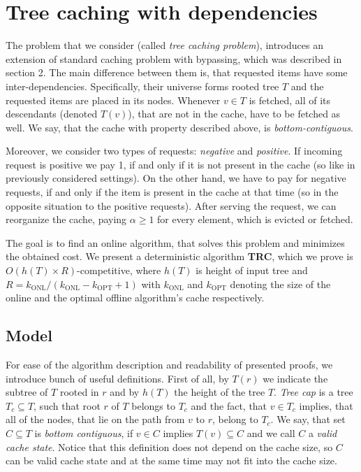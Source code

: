 \section{Tree caching with dependencies} \label{tree_caching_algo} The problem
that we consider (called \textit{tree caching problem}), introduces an extension
of standard caching problem with bypassing, which was described in section 2.
The main difference between them is, that requested items have some
inter-dependencies. Specifically, their universe forms rooted tree $T$ and the
requested items are placed in its nodes.  Whenever $v \in T$ is fetched, all of
its descendants (denoted $T(v)$), that are not in the cache, have to be fetched
as well. We say, that the cache with property described above, is
\textit{bottom-contiguous}.

Moreover, we consider two types of requests: \textit{negative} and
\textit{positive}. If incoming request is positive we pay 1, if and only if it
is not present in the cache (so like in previously considered settings). On the
other hand, we have to pay for negative requests, if and only if the item is
present in the cache at that time (so in the opposite situation to the positive
requests). After serving the request, we can reorganize the cache, paying
$\alpha \geq 1$ for every element, which is evicted or fetched. 

The goal is to find an online algorithm, that solves this problem and minimizes
the obtained cost. We present a deterministic algorithm \textbf{TRC}, which we
prove is $O(h(T) \times R)$-competitive, where $h(T)$ is height of input tree
and $R = k_{\mathrm{ONL}}/(k_{\mathrm{ONL}} - k_{\mathrm{OPT}} +1)$ with
$k_{\mathrm{ONL}}$ and $k_{\mathrm{OPT}}$ denoting the size of the online and
the optimal offline algorithm's cache respectively.

\subsection{Model}  For ease of the algorithm description
and readability of presented proofs, we introduce bunch of useful definitions.
First of all, by $T(r)$ we indicate the subtree of $T$ rooted in $r$ and by
$h(T)$ the height of the tree $T$.  \textit{Tree cap} is a tree $T_c \subseteq
T$, such that root $r$ of $T$ belongs to $T_c$ and the fact, that $v \in T_c$
implies, that all of the nodes, that lie on the path from $v$ to $r$, belong to
$T_c$.  We say, that set $C \subseteq T$ is \textit{bottom contiguous}, if $v
\in C$ implies $T(v) \subseteq C$ and we call $C$ a \textit{valid cache state}.
Notice that this definition does not depend on the cache size, so $C$ can be
valid cache state and at the same time may not fit into the cache size.

